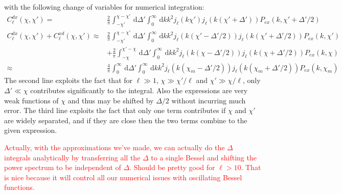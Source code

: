 \documentclass[onecolumn,prd,nofootinbib]{revtex4-1}
\newcommand{\ud}{\,\mathrm{d}}
\newcommand{\red}{\textcolor{red}}
\begin{document}
with the following change of variables for numerical integration:
\begin{align}
C^{dx}_\ell(\chi,\chi')
    =&
    \frac{2}{\pi}
    \int_{-\chi'}^{\chi - \chi'}\ud\Delta'
    \int_0^\infty\ud k k^2 j_\ell(k\chi')
    j_{\ell}(k(\chi'+\Delta'))
    P_{ex}(k, \chi' + \Delta'/2)
    \\
C^{dx}_\ell(\chi,\chi') + C^{xd}_\ell(\chi,\chi')
    \approx&
    \frac{2}{\pi}
    \int_{-\chi'}^{\chi - \chi'}\ud\Delta'
    \int_0^\infty\ud k k^2 j_\ell(k(\chi'-\Delta'/2))
    j_{\ell}(k(\chi'+\Delta'/2))
    P_{ex}(k, \chi')
    \nonumber\\
    &+
    \frac{2}{\pi}
    \int_{-\chi}^{\chi' - \chi}\ud\Delta'
    \int_0^\infty\ud k k^2 j_\ell(k(\chi-\Delta'/2))
    j_{\ell}(k(\chi+\Delta'/2))
    P_{ex}(k, \chi)\\
    \approx&
    \frac{4}{\pi}
    \int_{0}^{\infty}\ud\Delta'
    \int_0^\infty\ud k k^2 j_\ell(k(\chi_m-\Delta'/2))
    j_{\ell}(k(\chi_m+\Delta'/2))
    P_{ex}(k, \chi_m)
\end{align}
The second line exploits the fact that for $\ell \gg 1$, $\chi \gg \chi'/\ell$ and
$\chi' \gg \chi/\ell$, only $\Delta'\ll\chi$ contributes significantly to the
integral. Also the expressions are very weak functions of $\chi$ and thus
may be shifted by $\Delta/2$ without incurring much error. The third line
exploits the fact that only one term contributes if $\chi$ and $\chi'$ are
widely separated, and if they are close then the two terms combine to the given
expression.

\red{Actually, with the approximations we've made, we can actually do the
$\Delta$ integrals analytically by transferring all the $\Delta$ to a single
Bessel and shifting the power spectrum to be independent of $\Delta$.  Should
be pretty good for $\ell > 10$.  That is nice because it will control all our
numerical issues with oscillating Bessel functions.}
\end{document}
